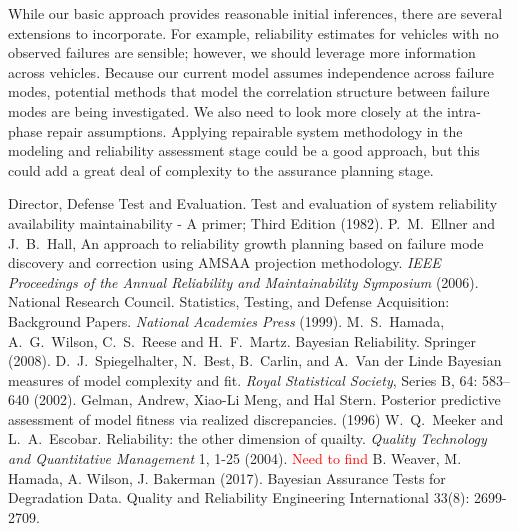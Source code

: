 \documentclass[12pt]{article}
\begin{document}
While our basic approach provides reasonable initial inferences, there are
several extensions to incorporate. For example, reliability estimates for
vehicles with no observed failures are sensible; however, we should leverage
more information across vehicles. Because our
current model assumes independence across failure modes, potential methods that model the correlation structure
between failure modes are being investigated. We
also need to look more closely at the intra-phase repair assumptions.  Applying
repairable system methodology in the modeling and reliability assessment stage
could be a good approach, but this could  add a great deal of complexity to the
assurance planning stage.


\begin{thebibliography}{99}
 Director, Defense Test and Evaluation. Test and evaluation of system reliability availability maintainability - A primer; Third Edition (1982).
 P.\ M.\ Ellner and J.\ B.\ Hall, An approach to reliability
growth planning based on failure mode discovery and correction using AMSAA
projection methodology. \textit{IEEE Proceedings of the Annual Reliability and
Maintainability Symposium} (2006).
 National Research Council. Statistics, Testing, and Defense
Acquisition: Background Papers. \textit{National Academies Press} (1999).
 M.\ S.\ Hamada, A.\ G.\ Wilson, C.\ S.\ Reese and H.\ F.\ Martz.
Bayesian Reliability. Springer (2008).
 D.\ J.\ Spiegelhalter, N.\ Best, B.\ Carlin, and A.\ Van der
Linde Bayesian measures of model complexity and fit. \textit{Royal Statistical
Society}, Series B, 64: 583–640 (2002).
 Gelman, Andrew, Xiao-Li Meng, and Hal Stern. Posterior
predictive assessment of model fitness via realized discrepancies. (1996)
 W.\ Q.\ Meeker and L.\ A.\ Escobar. Reliability: the other
dimension of quailty. \textit{Quality Technology and Quantitative Management} 1,
1-25 (2004).
 \textcolor{red}{Need to find}
 B. Weaver, M. Hamada, A. Wilson, J. Bakerman (2017). Bayesian Assurance Tests for Degradation Data. Quality and Reliability Engineering International 33(8): 2699-2709.
\end{thebibliography}
\end{document}
